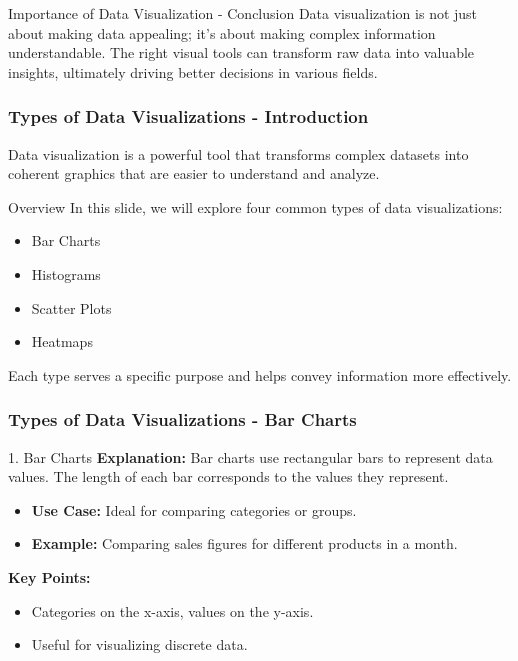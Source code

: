 \documentclass[aspectratio=169]{beamer}
\begin{document}
\begin{frame}[fragile]{Importance of Data Visualization - Conclusion}
    Data visualization is not just about making data appealing; it's about making complex information understandable. The right visual tools can transform raw data into valuable insights, ultimately driving better decisions in various fields.
\end{frame}

\begin{frame}[fragile]
    \frametitle{Types of Data Visualizations - Introduction}
    Data visualization is a powerful tool that transforms complex datasets into coherent graphics that are easier to understand and analyze. 
    \begin{block}{Overview}
        In this slide, we will explore four common types of data visualizations:
        \begin{itemize}
            \item Bar Charts
            \item Histograms
            \item Scatter Plots
            \item Heatmaps
        \end{itemize}
        Each type serves a specific purpose and helps convey information more effectively.
    \end{block}
\end{frame}

\begin{frame}[fragile]
    \frametitle{Types of Data Visualizations - Bar Charts}
    \begin{block}{1. Bar Charts}
        \textbf{Explanation:} Bar charts use rectangular bars to represent data values. The length of each bar corresponds to the values they represent.
        \begin{itemize}
            \item \textbf{Use Case:} Ideal for comparing categories or groups.
            \item \textbf{Example:} Comparing sales figures for different products in a month.
        \end{itemize}
        \textbf{Key Points:}
        \begin{itemize}
            \item Categories on the x-axis, values on the y-axis.
            \item Useful for visualizing discrete data.
        \end{itemize}
    \end{block}
\end{frame}
\end{document}
